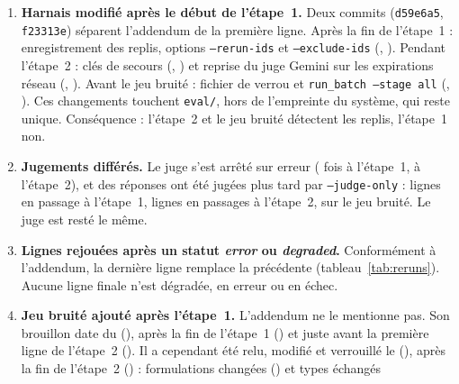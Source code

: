 \begin{enumerate}
        Analyse de sensibilité sans ces trois questions (\EvCommitSensitivity, \texttt{results/stage1\_sensitivity\_excl\_ac02\_ac29\_c02.txt}) : sur \EvSensCompared{}
        lignes de différences appariées, \EvSensFlipped{} changement de signe et \EvSensCrossed{} intervalle passé d'un côté à l'autre de zéro. \EvSensTouch{} intervalle
        qui touchait zéro le traverse désormais : v2 $-$ v1.1 sur l'hallucination. Le temps moyen de v2 passe de \EvSensVtwoSecondsFull~s à \EvSensVtwoSeconds~s.
  \item \textbf{Harnais modifié après le début de l'étape~1.} Deux commits (\texttt{d59e6a5}, \texttt{f23313e}) séparent l'addendum de la première ligne. Après la fin de
        l'étape~1 : enregistrement des replis, options \texttt{--rerun-ids} et \texttt{--exclude-ids} (\EvCommitFallbackFlags, \EvDateFallbackFlags). Pendant l'étape~2 : clés
        de secours (\EvCommitBackupKeys, \EvDateBackupKeys) et reprise du juge Gemini sur les expirations réseau (\EvCommitJudgeRetry, \EvDateJudgeRetry). Avant le jeu bruité :
        fichier de verrou et \texttt{run\_batch --stage all} (\EvCommitLockFile, \EvDateLockFile). Ces changements touchent \texttt{eval/}, hors de l'empreinte du système, qui
        reste unique. Conséquence : l'étape~2 et le jeu bruité détectent les replis, l'étape~1 non.
  \item \textbf{Jugements différés.} Le juge s'est arrêté sur erreur (\EvJudgeErrorsSone{} fois à l'étape~1, \EvJudgeErrorsStwo{} à l'étape~2), et des réponses ont été jugées
        plus tard par \texttt{--judge-only} : \EvJudgeOnlyRowsSone{} lignes en \EvJudgeOnlyRunsSone{} passage à l'étape~1, \EvJudgeOnlyRowsStwo{} lignes en \EvJudgeOnlyRunsStwo{} passages à
        l'étape~2, \EvJudgeOnlyRowsSnoisy{} sur le jeu bruité. Le juge est resté le même.
  \item \textbf{Lignes rejouées après un statut \emph{error} ou \emph{degraded}.} Conformément à l'addendum, la dernière ligne remplace la précédente (tableau~\ref{tab:reruns}). Aucune
        ligne finale n'est dégradée, en erreur ou en échec.
  \item \textbf{Jeu bruité ajouté après l'étape~1.} L'addendum ne le mentionne pas. Son brouillon date du \EvDateNoisyDraft{} (\EvCommitNoisyDraft), après la fin de l'étape~1
        (\EvDateStageOneDone) et juste avant la première ligne de l'étape~2 (\EvStwoFirst). Il a cependant été relu, modifié et verrouillé le \EvDateNoisyLock{}
        (\EvCommitNoisyLock), après la fin de l'étape~2 (\EvDateStageTwoDone) : \EvNoisyEdited{} formulations changées (\EvNoisyEditedIds) et \EvNoisySwapped{} types échangés

\end{enumerate}
